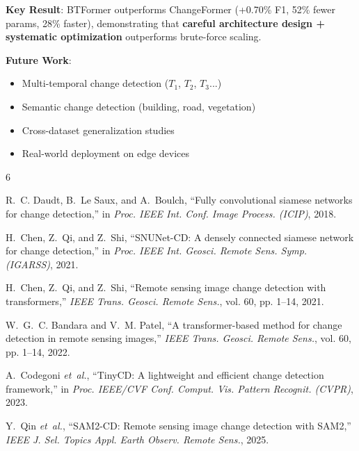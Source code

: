 \documentclass[journal]{IEEEtran}
\begin{document}
\textbf{Key Result}: BTFormer outperforms ChangeFormer (+0.70\% F1, 52\% fewer params, 28\% faster), demonstrating that \textbf{careful architecture design + systematic optimization} outperforms brute-force scaling.

\textbf{Future Work}:
\begin{itemize}
    \item Multi-temporal change detection ($T_1$, $T_2$, $T_3$...)
    \item Semantic change detection (building, road, vegetation)
    \item Cross-dataset generalization studies
    \item Real-world deployment on edge devices
\end{itemize}




\begin{thebibliography}{6}

R.~C. Daudt, B.~Le Saux, and A.~Boulch, ``Fully convolutional siamese networks for change detection,'' in \textit{Proc. IEEE Int. Conf. Image Process. (ICIP)}, 2018.

H.~Chen, Z.~Qi, and Z.~Shi, ``SNUNet-CD: A densely connected siamese network for change detection,'' in \textit{Proc. IEEE Int. Geosci. Remote Sens. Symp. (IGARSS)}, 2021.

H.~Chen, Z.~Qi, and Z.~Shi, ``Remote sensing image change detection with transformers,'' \textit{IEEE Trans. Geosci. Remote Sens.}, vol. 60, pp. 1--14, 2021.

W.~G.~C. Bandara and V.~M. Patel, ``A transformer-based method for change detection in remote sensing images,'' \textit{IEEE Trans. Geosci. Remote Sens.}, vol. 60, pp. 1--14, 2022.

A.~Codegoni \textit{et~al.}, ``TinyCD: A lightweight and efficient change detection framework,'' in \textit{Proc. IEEE/CVF Conf. Comput. Vis. Pattern Recognit. (CVPR)}, 2023.

Y.~Qin \textit{et~al.}, ``SAM2-CD: Remote sensing image change detection with SAM2,'' \textit{IEEE J. Sel. Topics Appl. Earth Observ. Remote Sens.}, 2025.

\end{thebibliography}
\end{document}
